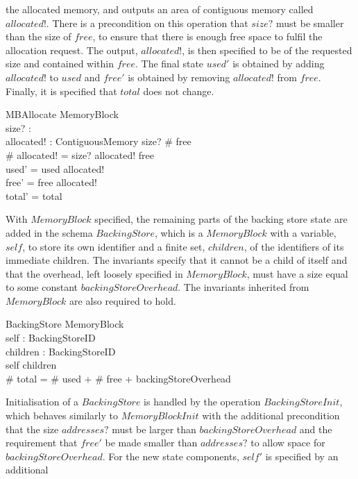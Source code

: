 \documentclass[a4paper,10pt]{report}
\begin{document}
the allocated memory, and outputs an area of contiguous memory called
$allocated!$.
There is a precondition on this operation that $size?$ must be smaller
than the size of $free$, to ensure that there is enough free space to
fulfil the allocation request.
The output, $allocated!$, is then specified to be of the requested
size and contained within $free$.
The final state $used'$ is obtained by adding $allocated!$ to $used$
and $free'$ is obtained by removing $allocated!$ from $free$.
Finally, it is specified that $total$ does not change.
%
\begin{schema}{MBAllocate}
  \Delta MemoryBlock \\
  size?
  : \nat \\
  allocated!
  : ContiguousMemory \where size?
  \leq \# free \\
  \# allocated!
  = size?
  \land allocated!
  \subseteq free \\
  used' = used \cup allocated!
  \\
  free' = free \setminus allocated!
  \\
  total' = total \\
\end{schema}
%
With $MemoryBlock$ specified, the remaining parts of the backing store
state are added in the schema $BackingStore$, which is a $MemoryBlock$
with a variable, $self$, to store its own identifier and a finite set,
$children$, of the identifiers of its immediate children.
The invariants specify that it cannot be a child of itself and that
the overhead, left loosely specified in $MemoryBlock$, must have a
size equal to some constant $backingStoreOverhead$.
The invariants inherited from $MemoryBlock$ are also required to hold.
%
\begin{schema}{BackingStore}
  MemoryBlock \\
  self : BackingStoreID \\
  children : \finset BackingStoreID \\
  \where
  self \notin children \\
  \# total = \# used + \# free + backingStoreOverhead
\end{schema}
%
Initialisation of a $BackingStore$ is handled by the operation
$BackingStoreInit$, which behaves similarly to $MemoryBlockInit$ with
the additional precondition that the size $addresses?$ must be larger
than $backingStoreOverhead$ and the requirement that $free'$ be made
smaller than $addresses?$ to allow space for $backingStoreOverhead$.
For the new state components, $self'$ is specified by an additional
\end{document}
